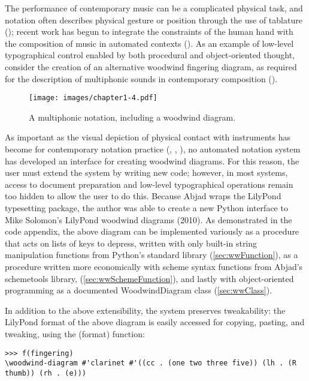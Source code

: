 The performance of contemporary music can be a complicated physical task, and notation often describes physical gesture or position through the use of tablature (\cite[143]{Rastall:1983zr}); recent work has begun to integrate the constraints of the human hand with the composition of music in automated contexts (\cite{Truchet:2004ys}). As an example of low-level typographical control enabled by both procedural and object-oriented thought, consider the creation of an alternative woodwind fingering diagram, as required for the description of multiphonic sounds in contemporary composition (\cite{Backus:1978fv}).   

\begin{figure}[h] 
\centering
\texttt{[image: images/chapter1-4.pdf]}

\caption{A multiphonic notation, including a woodwind diagram.} 
\end{figure}

As important as the visual depiction of physical contact with instruments has become for contemporary notation practice (\cite{Alberman:2005dz}, \cite{Cassidy:2004fu}, \cite{Kanno:2007kl}), no automated notation system has developed an interface for creating woodwind diagrams. For this reason, the user must extend the system by writing new code; however, in most systems, access to document preparation and low-level typographical operations remain too hidden to allow the user to do this. Because Abjad wraps the LilyPond typesetting package, the author was able to create a new Python interface to Mike Solomon's LilyPond woodwind diagrams (2010). As demonstrated in the code appendix, the above diagram can be implemented variously as a procedure that acts on lists of keys to depress, written with only built-in string manipulation functions from Python's standard library (\ref{sec:wwFunction}), as a procedure written more economically with scheme syntax functions from Abjad's schemetools library, (\ref{sec:wwSchemeFunction}), and lastly with object-oriented programming as a documented WoodwindDiagram class (\ref{sec:wwClass}).

In addition to the above extensibility, the system preserves tweakability: the LilyPond format of the above diagram is easily accessed for copying, pasting, and tweaking, using the  (format) function:

\begin{lstlisting}[basicstyle=\scriptsize\ttfamily, breaklines=True, tabsize=4, showtabs=false, showspaces=false]
>>> f(fingering)
\woodwind-diagram #'clarinet #'((cc . (one two three five)) (lh . (R thumb)) (rh . (e)))\end{lstlisting}


